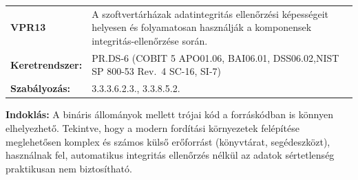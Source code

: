 \documentclass[12pt,magyar,a4paper,oneside]{scrreprt}
\begin{document}
\begin{longtable}[]{@{}ll@{}}
\toprule
\endhead
\begin{minipage}[t]{0.16\columnwidth}\raggedright
\textbf{VPR13}\strut
\end{minipage} & \begin{minipage}[t]{0.79\columnwidth}\raggedright
A szoftvertárházak adatintegritás ellenőrzési képességeit helyesen és
folyamatosan használják a komponensek integritás-ellenőrzése
során.\strut
\end{minipage}\tabularnewline
\begin{minipage}[t]{0.16\columnwidth}\raggedright
\textbf{Keretrendszer:}\strut
\end{minipage} & \begin{minipage}[t]{0.79\columnwidth}\raggedright
PR.DS-6 (COBIT 5 APO01.06, BAI06.01, DSS06.02,NIST SP 800-53 Rev.~4
SC-16, SI-7)\strut
\end{minipage}\tabularnewline
\begin{minipage}[t]{0.16\columnwidth}\raggedright
\textbf{Szabályozás:}\strut
\end{minipage} & \begin{minipage}[t]{0.79\columnwidth}\raggedright
3.3.3.6.2.3., 3.3.8.5.2.\strut
\end{minipage}\tabularnewline
\bottomrule
\end{longtable}

\textbf{Indoklás: } A bináris állományok mellett trójai kód a
forráskódban is könnyen elhelyezhető. Tekintve, hogy a modern fordítási
környezetek felépítése meglehetősen komplex és számos külső erőforrást
(könyvtárat, segédeszközt), használnak fel, automatikus integritás
ellenőrzés nélkül az adatok sértetlenség praktikusan nem biztosítható.
\end{document}
